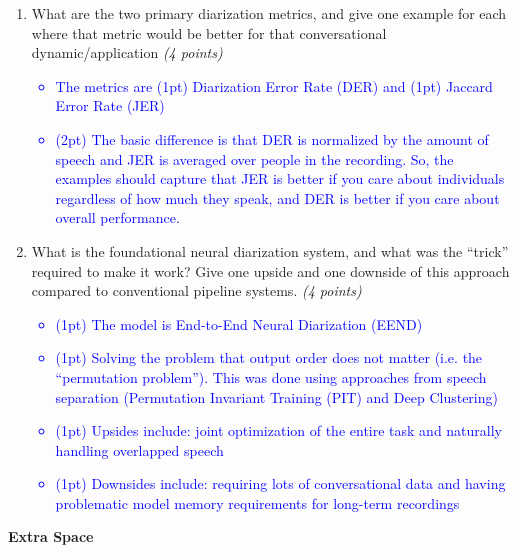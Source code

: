 \documentclass[12pt]{article}
\newcommand{\solution}[2]{\textcolor{blue}{\em #1}} %
\begin{document}
\begin{enumerate}
\item What are the two primary diarization metrics, and give one example for each where that metric would be better for that conversational dynamic/application
\hfill{\em (4 points)}
\solution{
\begin{itemize}
    \item The metrics are (1pt) Diarization Error Rate (DER) and (1pt) Jaccard Error Rate (JER)
    \item (2pt) The basic difference is that DER is normalized by the amount of speech and JER is averaged over people in the recording. So, the examples should capture that JER is better if you care about individuals regardless of how much they speak, and DER is better if you care about overall performance.
\end{itemize}
}{\vspace{8cm}}

\item What is the foundational neural diarization system, and what was the ``trick'' required to make it work? Give one upside and one downside of this approach compared to conventional pipeline systems.
\hfill{\em (4 points)}
\solution{
\begin{itemize}
    \item (1pt) The model is End-to-End Neural Diarization (EEND)
    \item (1pt) Solving the problem that output order does not matter (i.e. the ``permutation problem''). This was done using approaches from speech separation (Permutation Invariant Training (PIT) and Deep Clustering)
    \item (1pt) Upsides include: joint optimization of the entire task and naturally handling overlapped speech
    \item (1pt) Downsides include: requiring lots of conversational data and having problematic model memory requirements for long-term recordings
\end{itemize}
}{\vspace{2cm}}

\end{enumerate}

\newpage

\textbf{\Large Extra Space}
\end{document}
